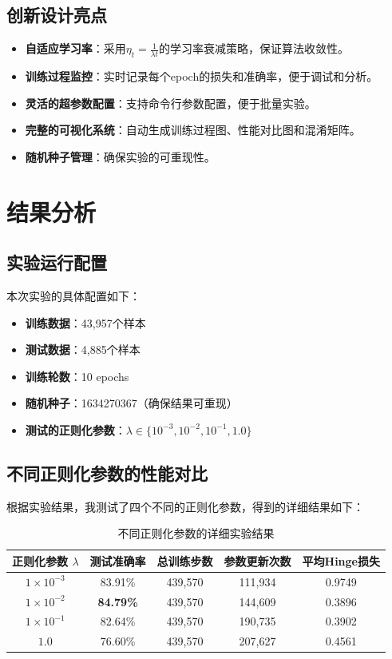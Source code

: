 \documentclass[a4paper]{article}
\begin{document}
\subsection{创新设计亮点}

\begin{itemize}
    \item \textbf{自适应学习率}：采用$\eta_t = \frac{1}{\lambda t}$的学习率衰减策略，保证算法收敛性。
    \item \textbf{训练过程监控}：实时记录每个epoch的损失和准确率，便于调试和分析。
    \item \textbf{灵活的超参数配置}：支持命令行参数配置，便于批量实验。
    \item \textbf{完整的可视化系统}：自动生成训练过程图、性能对比图和混淆矩阵。
    \item \textbf{随机种子管理}：确保实验的可重现性。
\end{itemize}

\section{结果分析}

\subsection{实验运行配置}

本次实验的具体配置如下：
\begin{itemize}
    \item \textbf{训练数据}：43,957个样本
    \item \textbf{测试数据}：4,885个样本  
    \item \textbf{训练轮数}：10 epochs
    \item \textbf{随机种子}：1634270367（确保结果可重现）
    \item \textbf{测试的正则化参数}：$\lambda \in \{10^{-3}, 10^{-2}, 10^{-1}, 1.0\}$
\end{itemize}

\subsection{不同正则化参数的性能对比}

根据实验结果，我测试了四个不同的正则化参数，得到的详细结果如下：

\begin{table}[H]
\centering
\caption{不同正则化参数的详细实验结果}
\begin{tabular}{ccccc}
\toprule
正则化参数 $\lambda$ & 测试准确率 & 总训练步数 & 参数更新次数 & 平均Hinge损失 \\
\midrule
$1 \times 10^{-3}$ & 83.91\% & 439,570 & 111,934 & 0.9749 \\
$1 \times 10^{-2}$ & \textbf{84.79\%} & 439,570 & 144,609 & 0.3896 \\
$1 \times 10^{-1}$ & 82.64\% & 439,570 & 190,735 & 0.3902 \\
$1.0$ & 76.60\% & 439,570 & 207,627 & 0.4561 \\
\bottomrule
\end{tabular}
\end{table}
\end{document}
